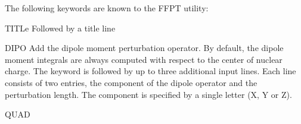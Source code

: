 The following keywords are known to the
{\prgmfont FFPT} utility:
\begin{keywordlist}
\item[TITLe]
Followed by a title line
\item[DIPO]
Add the dipole moment perturbation operator. By default, the dipole moment
integrals are always computed with respect to the center of nuclear
charge. The keyword is followed by up to three additional input
lines. Each line consists of two entries, the component
of the dipole operator and the perturbation length. The component is
specified by a single letter (X, Y or Z).
\item[QUAD]

\end{keywordlist}
